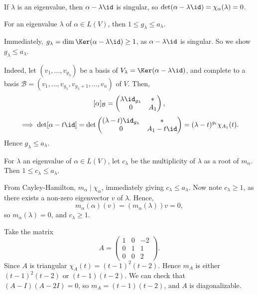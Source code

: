 \documentclass[12pt]{article}
\begin{document}
\begin{remark}
	If $\lambda$ is an eigenvalue, then $\alpha - \lambda \id$ is singular, so $\det(\alpha - \lambda \id) = \chi_{\alpha}(\lambda) = 0$.
\end{remark}

\begin{lemma}
	For an eigenvalue $\lambda$ of $\alpha \in L(V)$, then $1 \leq g_{\lambda} \leq a_{\lambda}$.
\end{lemma}

\begin{proofbox}
	Immediately, $g_{\lambda} = \dim \Ker(\alpha - \lambda \id) \geq 1$, as $\alpha - \lambda \id$ is singular. So we show $g_{\lambda} \leq a_{\lambda}$.

	Indeed, let $(v_1, \ldots, v_{g_{\lambda}})$ be a basis of $V_{\lambda} = \Ker(\alpha - \lambda \id)$, and complete to a basis $\mathcal{B} = (v_1, \ldots, v_{g_{\lambda}}, v_{g_{\lambda} + 1}, \ldots, v_n)$ of $V$. Then,
	\[
		[\alpha]_{\mathcal{B}} =
		\begin{pmatrix}
			\lambda \id_{g_{\lambda}} & \ast \\
			0 & A_1
		\end{pmatrix}
	,\]
	\[
		\implies \det[\alpha - t \id] = \det
		\begin{pmatrix}
			(\lambda - t) \id_{g_{\lambda}} & \ast \\
			0 & A_1 - t \id
		\end{pmatrix}
		= (\lambda - t)^{g_t} \chi_{A_1}(t)
	.\]
	Hence $g_{\lambda} \leq a_{\lambda}$.
\end{proofbox}

\begin{lemma}
	For $\lambda$ an eigenvalue of $\alpha \in L(V)$, let $c_{\lambda}$ be the multiplicity of $\lambda$ as a root of $m_{\alpha}$. Then $1 \leq c_{\lambda} \leq a_{\lambda}$.
\end{lemma}

\begin{proofbox}
	From Cayley-Hamilton, $m_{\alpha} \mid \chi_{\alpha}$, immediately giving $c_{\lambda} \leq a_{\lambda}$. Now note $c_{\lambda} \geq 1$, as there exists a non-zero eigenvector $v$ of $\lambda$. Hence,
	\[
		m_{\alpha}(\alpha)(v) = (m_{\alpha}(\lambda))v = 0
	,\]
	so $m_{\alpha}(\lambda) = 0$, and $c_{\lambda} \geq 1$.
\end{proofbox}

\begin{exbox}
	Take the matrix
	\[
	A =
	\begin{pmatrix}
		1 & 0 & -2 \\
		0 & 1 & 1 \\
		0 & 0 & 2
	\end{pmatrix}
	.\]
	Since $A$ is triangular $\chi_{A}(t) = (t - 1)^2(t - 2)$. Hence $m_{A}$ is either $(t - 1)^2(t - 2)$ or $(t - 1)(t - 2)$. We can check that $(A - I)(A - 2I) = 0$, so $m_{A} = (t - 1)(t - 2)$, and $A$ is diagonalizable.
\end{exbox}
\end{document}
